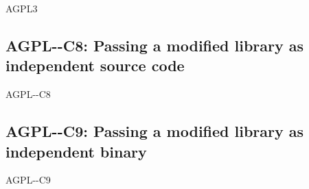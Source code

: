 \begin{license}{AGPL3}
\subsection{AGPL-\ver-C8: Passing a modified library as independent source code}
\begin{lsuc}{AGPL-\ver-C8}
  \label{OSUC-08S-AGPL}

  \useCaseEight

  \begin{lsucrequires}
     \lsucmandatory{\keepLicenseElements}
    \lsucmandatory{\gplthreeEnsureCopyrightNoticeSource}
    \lsucmandatory{\giveLicense}\passingFilesCorrectly
    \lsucmandatory{\retainCopyrightNotices}
    \lsucmandatory{\markLibraryModifications}
    \lsucmandatory{\arrangeLibraryChanges}\howToApplyTheseTerms
    \lsucoptional{\createChangelog}
    \lsucoptional{\addToDocumentation}
  \end{lsucrequires}

  \begin{lsucprohibits}
    \lsucitem{\noPatentLitigation}
  \end{lsucprohibits}
\end{lsuc}

\subsection{AGPL-\ver-C9: Passing a modified library as independent binary}
\begin{lsuc}{AGPL-\ver-C9}
  \label{OSUC-08B-AGPL}

  \useCaseNine

  \begin{lsucrequires}
    \lsucmandatory{\keepLicenseElements}
    \lsucmandatory{\gplthreeEnsureCopyrightNoticeSource}  
    \lsucmandatory{\giveLicense}\passingFilesCorrectly
    \lsucmandatory{\retainCopyrightNotices}
    \lsucmandatory{\makeModifiedSourceAvailable}
    \lsucmandatory{\describeHowToGetSource}
    \lsucmandatory{\markLibraryModifications}
    \lsucmandatory{\arrangeLibraryChanges}\howToApplyTheseTerms
    \lsucoptional{\createChangelog}
    \lsucoptional{\addToDocumentation}
  \end{lsucrequires}

  \begin{lsucprohibits}
    \lsucitem{\noPatentLitigation}
  \end{lsucprohibits}
\end{lsuc}


\end{license}

